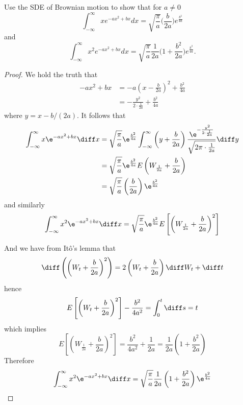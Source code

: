     \problem
    \begin{question}
        Use the SDE of Brownian motion to show that for $a\neq 0$
        \[\int_{-\infty}^\infty xe^{-ax^2+bx}dx=\sqrt{\frac{\pi}{a}}\Big(\frac{b}{2a}\Big)e^\frac{b^2}{4a}\]
        and
        \[\int_{-\infty}^\infty x^2e^{-ax^2+bx}dx=\sqrt{\frac{\pi}{a}}\frac{1}{2a}\Big(1+\frac{b^2}{2a}\Big)e^\frac{b^2}{4a}.\]
    \end{question}
    \begin{proof}
        We hold the truth that
        \[\begin{aligned}
            -ax^2+bx&=-a\left(x-\frac{b}{2a}\right)^2+\frac{b^2}{4a}\\
            &=-\frac{y^2}{2\cdot\frac{1}{2a}}+\frac{b^2}{4a}
        \end{aligned}\]
        where $y=x-b/(2a)$.
        It follows that
        \[\begin{aligned}
            \int_{-\infty}^\infty x\e^{-ax^2+bx}\diff x
            &= \sqrt{\frac{\pi}{a}}\e^{\frac{b^2}{4a}}
            \int_{-\infty}^\infty \left(y+\frac{b}{2a}\right)
            \frac{\e^{-\frac{y^2}{2\cdot\frac{1}{2a}}}}{\sqrt{2\pi\cdot\frac{1}{2a}}}\diff y\\
            &=\sqrt{\frac{\pi}{a}}\e^{\frac{b^2}{4a}}E\left(W_{\frac{1}{2a}}+\frac{b}{2a}\right)\\
            &=\sqrt{\frac{\pi}{a}}\left(\frac{b}{2a}\right)\e^{\frac{b^2}{4a}}
        \end{aligned}\]
        and similarly
        \[\begin{aligned}
            \int_{-\infty}^\infty x^2\e^{-ax^2+bx}\diff x
            =\sqrt{\frac{\pi}{a}}\e^{\frac{b^2}{4a}}
            E\left[\left(W_{\frac{1}{2a}}+\frac{b}{2a}\right)^2\right]
        \end{aligned}\]
        
        And we have from It\^o's lemma that
        \[\diff\left(\left(W_t+\frac{b}{2a}\right)^2\right)
        =2\left(W_t+\frac{b}{2a}\right)\diff W_t+\diff t\]
        hence
        \[E\left[\left(W_t+\frac{b}{2a}\right)^2\right]
        -\frac{b^2}{4a^2}=\int_0^t\diff s=t\]
        which implies
        \[E\left[\left(W_{\frac{1}{2a}}+\frac{b}{2a}\right)^2\right]
        =\frac{b^2}{4a^2}+\frac{1}{2a}=\frac{1}{2a}\left(1+\frac{b^2}{2a}\right)\]
        Therefore
        \[\int_{-\infty}^\infty x^2\e^{-ax^2+bx}\diff x
        =\sqrt{\frac{\pi}{a}}\frac{1}{2a}\left(1+\frac{b^2}{2a}\right)\e^{\frac{b^2}{4a}}\]
    \end{proof}